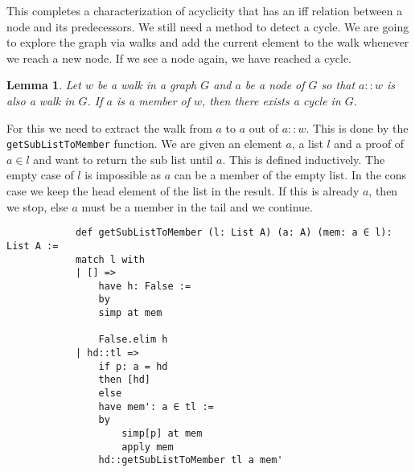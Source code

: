 \documentclass{article}
\newtheorem{lemma}{Lemma}
\begin{document}
        This completes a characterization of acyclicity that has an iff relation between a node and its predecessors. We still need a method to detect a cycle. We are going to explore the graph via walks and add the current element to the walk whenever we reach a new node. If we see a node again, we have reached a cycle.

        \begin{lemma}
            Let $w$ be a walk in a graph $G$ and $a$ be a node of $G$ so that $a::w$ is also a walk in $G$. If $a$ is a member of $w$, then there exists a cycle in $G$.
        \end{lemma}

        For this we need to extract the walk from $a$ to $a$ out of $a::w$. This is done by the \texttt{getSubListToMember} function. We are given an element $a$, a list $l$ and a proof of $a\in l$ and want to return the sub list until $a$. This is defined inductively. The empty case of $l$ is impossible as $a$ can be a member of the empty list. In the cons case we keep the head element of the list in the result. If this is already $a$, then we stop, else $a$ must be a member in the tail and we continue.

        \begin{lstlisting}
            def getSubListToMember (l: List A) (a: A) (mem: a ∈ l): List A :=
            match l with
            | [] =>
                have h: False :=
                by
                simp at mem

                False.elim h
            | hd::tl =>
                if p: a = hd
                then [hd]
                else
                have mem': a ∈ tl :=
                by
                    simp[p] at mem
                    apply mem
                hd::getSubListToMember tl a mem'
        \end{lstlisting}
\end{document}

